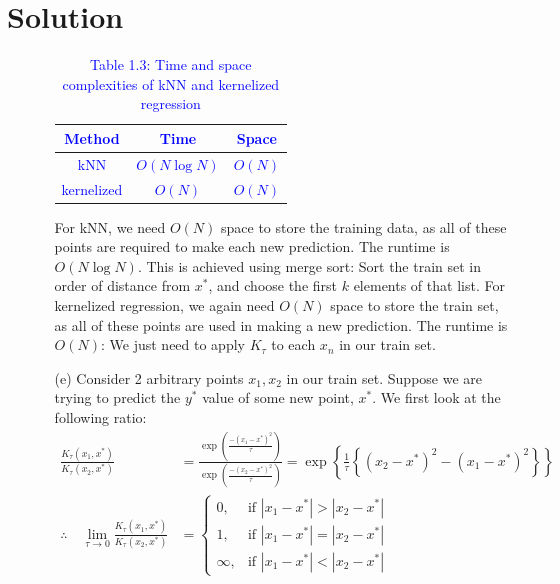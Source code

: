 \documentclass[submit]{../harvardml}
\newenvironment{solution}
  {\color{blue}\section*{Solution}}
{}
\begin{document}
\begin{solution}
\begin{enumerate}
\begin{enumerate}
\begin{table}[H]
            \begin{tabular}{|c|c|c|}
                \hline
                \textbf{\textcolor{blue}{Method}} & \textbf{\textcolor{blue}{Time}} & \textbf{\textcolor{blue}{Space}} \\ 
                \hline
                \textcolor{blue}{kNN} & \textcolor{blue}{$O(N\log N)$} & \textcolor{blue}{$O(N)$} \\ 
                \textcolor{blue}{kernelized} & \textcolor{blue}{$O(N)$} & \textcolor{blue}{$O(N)$} \\ 
                \hline
            \end{tabular}
            \caption*{\textcolor{blue}{Table 1.3: Time and space complexities of kNN and kernelized regression}}
            \label{tab:knn_kernel}
        \end{table}
        For kNN, we need $O(N)$ space to store the training data, as all of these points are required to make each new prediction. The runtime is $O(N\log N)$. This is achieved using merge sort: Sort the train set in order of distance from $x^*$, and choose the first $k$ elements of that list.
        \newline \newline
        For kernelized regression, we again need $O(N)$ space to store the train set, as all of these points are used in making a new prediction. The runtime is $O(N)$: We just need to apply $K_\tau$ to each $x_n$ in our train set.
        \item[(e)] Consider 2 arbitrary points $x_1,x_2$ in our train set. Suppose we are trying to predict the $y^*$ value of some new point, $x^*$. We first look at the following ratio:
        \begin{align*}
            \frac{K_\tau(x_1,x^*)}{K_\tau(x_2,x^*)} &= \frac{\exp \left({\frac{-(x_1-x^*)^2}{\tau}}\right)}{\exp \left({\frac{-(x_2-x^*)^2}{\tau}}\right)} = \exp \left\{ \frac{1}{\tau} \left\{ (x_2-x^*)^2 - (x_1-x^*)^2 \right\} \right\} \\
            \therefore \quad \lim_{\tau \to 0} \frac{K_\tau(x_1,x^*)}{K_\tau(x_2,x^*)} &= \begin{cases} 
                                    0, & \text{if } |x_1-x^*| > |x_2-x^*| \\
                                    1, & \text{if } |x_1-x^*| = |x_2-x^*| \\
                                    \infty, & \text{if } |x_1-x^*| < |x_2-x^*|

\end{cases}
\end{align*}
\end{enumerate}
\end{enumerate}
\end{solution}
\end{document}

